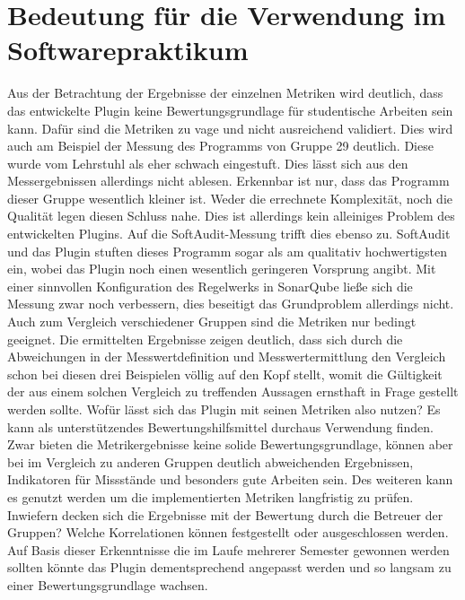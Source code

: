 \documentclass[gb,ngerman]{stthesis}
\begin{document}
		\section{Bedeutung für die Verwendung im Softwarepraktikum}
			Aus der Betrachtung der Ergebnisse der einzelnen Metriken wird deutlich, dass das entwickelte Plugin keine Bewertungsgrundlage für studentische Arbeiten sein kann. Dafür sind die Metriken zu vage und nicht ausreichend validiert. Dies wird auch am Beispiel der Messung des Programms von Gruppe 29 deutlich. Diese wurde vom Lehrstuhl als eher schwach eingestuft. Dies lässt sich aus den Messergebnissen allerdings nicht ablesen. Erkennbar ist nur, dass das Programm dieser Gruppe wesentlich kleiner ist. Weder die errechnete Komplexität, noch die Qualität legen diesen Schluss nahe. Dies ist allerdings kein alleiniges Problem des entwickelten Plugins. Auf die SoftAudit-Messung trifft dies ebenso zu. SoftAudit und das Plugin stuften dieses Programm sogar als am qualitativ hochwertigsten ein, wobei das Plugin noch einen wesentlich geringeren Vorsprung angibt. Mit einer sinnvollen Konfiguration des Regelwerks in SonarQube ließe sich die Messung zwar noch verbessern, dies beseitigt das Grundproblem allerdings nicht. \newline
			Auch zum Vergleich verschiedener Gruppen sind die Metriken nur bedingt geeignet. Die ermittelten Ergebnisse zeigen deutlich, dass sich durch die Abweichungen in der Messwertdefinition und Messwertermittlung den Vergleich schon bei diesen drei Beispielen völlig auf den Kopf stellt, womit die Gültigkeit der aus einem solchen Vergleich zu treffenden Aussagen ernsthaft in Frage gestellt werden sollte. \newline \newline
			Wofür lässt sich das Plugin mit seinen Metriken also nutzen? \newline \newline
			Es kann als unterstützendes Bewertungshilfsmittel durchaus Verwendung finden. Zwar bieten die Metrikergebnisse keine solide Bewertungsgrundlage, können aber bei im Vergleich zu anderen Gruppen deutlich abweichenden Ergebnissen, Indikatoren für Missstände und besonders gute Arbeiten sein. \newline
			Des weiteren kann es genutzt werden um die implementierten Metriken langfristig zu prüfen. Inwiefern decken sich die Ergebnisse mit der Bewertung durch die Betreuer der Gruppen? Welche Korrelationen können festgestellt oder ausgeschlossen werden. Auf Basis dieser Erkenntnisse die im Laufe mehrerer Semester gewonnen werden sollten könnte das Plugin dementsprechend angepasst werden und so langsam zu einer Bewertungsgrundlage wachsen. 
\end{document}
